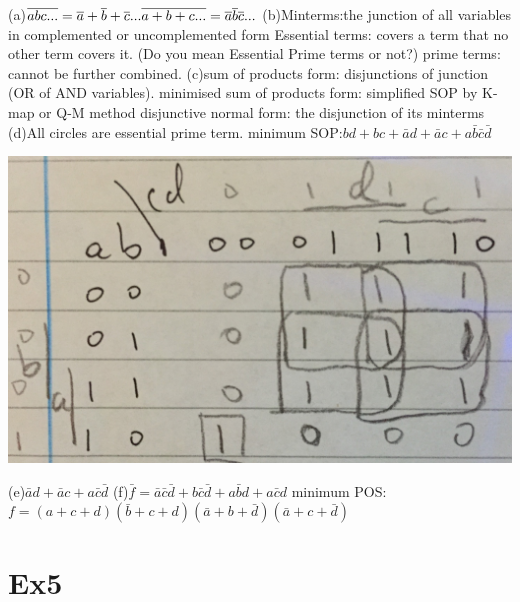 \documentclass[10pt,twoside,a4paper]{article}
\begin{document}
(a)$\overline{abc...}=\overline{a}+\overline{b}+\overline{c}...\\
\overline{a+b+c...}=\overline{a}\overline{b}\overline{c}...
$\newline
(b)Minterms:the junction of all variables in complemented or uncomplemented form\newline
   Essential terms: covers a term that no other term covers it. (Do you mean Essential Prime terms or not?)\newline
   prime terms: cannot be further combined.\newline
(c)sum of products form: disjunctions of junction (OR of AND variables).\newline
   minimised sum of products form: simplified SOP by K-map or  Q-M method\newline
   disjunctive normal form: the disjunction of its minterms\newline
(d)All circles are essential prime term.\newline
   minimum SOP:$bd+bc+\bar{a}d+\bar{a}c+a\bar{b}\bar{c}\bar{d}$\newline
   
\includegraphics[scale=0.1]{4-d.JPG}

(e)$\bar{a}d+\bar{a}c+a\bar{c}\bar{d}$\newline
(f)$\bar{f}=\bar{a}\bar{c}\bar{d}+b\bar{c}\bar{d}+a\bar{b}d+a\bar{c}d$\newline
minimum POS:$f=(a+c+d)(\bar{b}+c+d)(\bar{a}+b+\bar{d})(\bar{a}+c+\bar{d})$
\section{Ex5}
\end{document}
